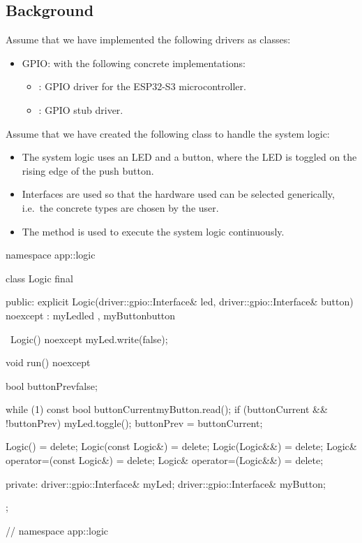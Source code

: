 \subsection{Background}
\label{c4:sec:background}
Assume that we have implemented the following drivers as classes:
\begin{itemize}
  \item GPIO:  with the following concrete implementations:
  \begin{itemize}
    \item {}: GPIO driver for the ESP32-S3 microcontroller.
    \item {}: GPIO stub driver.
  \end{itemize}
\end{itemize}
Assume that we have created the following class  to handle the system
logic:
\begin{itemize}
  \item The system logic uses an LED and a button, where the LED is toggled on the rising edge of
    the push button.
  \item Interfaces are used so that the hardware used can be selected generically, i.e.\ the
    concrete types are chosen by the user.
  \item The method  is used to execute the system logic continuously.
\end{itemize}

\begin{cppcode}
namespace app::logic
{
class Logic final
{
public:
    explicit Logic(driver::gpio::Interface& led,
                   driver::gpio::Interface& button) noexcept
        : myLed{led}
        , myButton{button}
    {}

    ~Logic() noexcept
    {
        myLed.write(false);
    }

    void run() noexcept
    {
        bool buttonPrev{false};

        while (1)
        {
            const bool buttonCurrent{myButton.read()};
            if (buttonCurrent && !buttonPrev)
            {
                myLed.toggle();
            }
            buttonPrev = buttonCurrent;
        }
    }

    Logic()                        = delete;
    Logic(const Logic&)            = delete;
    Logic(Logic&&)                 = delete;
    Logic& operator=(const Logic&) = delete;
    Logic& operator=(Logic&&)      = delete;

private:
    driver::gpio::Interface& myLed;
    driver::gpio::Interface& myButton;
};
} // namespace app::logic
\end{cppcode}

